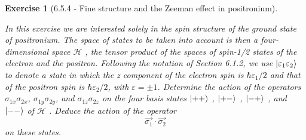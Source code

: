 \documentclass[12pt]{article}
\def\be{\begin{equation}}
\def\ee{\end{equation}}
\newtheorem{exercise}{Exercise}
\begin{document}
\begin{exercise}[6.5.4 - Fine structure and the Zeeman effect in positronium]
\begin{exercises}
			\item In this exercise we are interested solely in the spin structure of the ground state of positronium.
			The space of states to be taken into account is then a four-dimensional space $\mathcal{H}$ , the tensor
			product of the spaces of spin-1/2 states of the electron and the positron. Following the notation
			of Section 6.1.2, we use $\ket{\varepsilon_1\varepsilon_2}$ to denote a state in which the z component of the electron spin is
			$\hbar\varepsilon_1/2$ and that of the positron spin is $\hbar\varepsilon_2/2$, with $\varepsilon = \pm1$. Determine the action of the operators	$\sigma_{1x}\sigma_{2x}$, $\sigma_{1y}\sigma_{ 2y}$, and $\sigma_{1z} \sigma_{2z}$ on the four basis states $\ket{++}$ , $\ket{+-}$ , $\ket{-+}$ , and $\ket{--}$ of $\mathcal{H}$ .
			Deduce the action of the operator
			\be
				\vec{\sigma_1}\cdot\vec{\sigma_2}
			\ee
			on these states.
\end{exercises}
\end{exercise}
\end{document}
